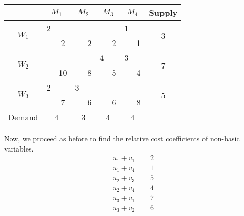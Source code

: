 \documentclass[../main-sheet.tex]{subfiles}
\begin{document}
    \begin{table}[H]
        \centering
        \begin{tabular}{|c|cc|cc|cc|cc|c|}
        \hline
                               & \multicolumn{2}{c|}{$M_1$} & \multicolumn{2}{c|}{$M_2$} & \multicolumn{2}{c|}{$M_3$} & \multicolumn{2}{c|}{$M_4$} & Supply             \\ \hline
        \multirow{2}{*}{$W_1$} & 2                     &    &                        &   &                        &   & 1                      &   & \multirow{2}{*}{3} \\ \cline{3-3} \cline{5-5} \cline{7-7} \cline{9-9}
                               & \multicolumn{1}{c|}{} & 2  & \multicolumn{1}{c|}{}  & 2 & \multicolumn{1}{c|}{}  & 2 & \multicolumn{1}{c|}{}  & 1 &                    \\ \hline
        \multirow{2}{*}{$W_2$} &                       &    &                        &   & 4                      &   & 3                      &   & \multirow{2}{*}{7} \\ \cline{3-3} \cline{5-5} \cline{7-7} \cline{9-9}
                               & \multicolumn{1}{c|}{} & 10 & \multicolumn{1}{c|}{}  & 8 & \multicolumn{1}{c|}{}  & 5 & \multicolumn{1}{c|}{}  & 4 &                    \\ \hline
        \multirow{2}{*}{$W_3$} & 2                     &    & 3                      &   &                        &   &                        &   & \multirow{2}{*}{5} \\ \cline{3-3} \cline{5-5} \cline{7-7} \cline{9-9}
                               & \multicolumn{1}{c|}{} & 7  & \multicolumn{1}{c|}{}  & 6 & \multicolumn{1}{c|}{}  & 6 & \multicolumn{1}{c|}{}  & 8 &                    \\ \hline
        Demand                 & \multicolumn{2}{c|}{4}     & \multicolumn{2}{c|}{3}     & \multicolumn{2}{c|}{4}     & \multicolumn{2}{c|}{4}     &                    \\ \hline
        \end{tabular}
        \end{table}
    Now, we proceed as before to find the relative cost coefficients of non-basic variables.
    \begin{align*}
        u_1+v_1&=2\\
        u_1+v_4&=1\\
        u_2+v_3&=5\\
        u_2+v_4&=4\\
        u_3+v_1&=7\\
        u_3+v_2&=6
    \end{align*}
\end{document}
